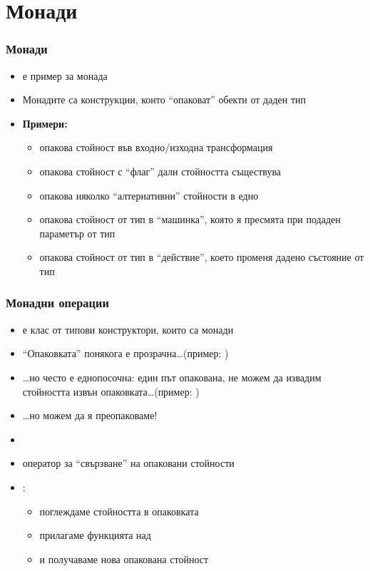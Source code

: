 \documentclass[alsotrans]{beamerswitch}
\begin{document}
\section{Монади}

\begin{frame}
  \frametitle{Монади}

  \begin{itemize}[<+->]
  \item {} е пример за \alert{монада}
  \item Монадите са конструкции, които ``опаковат'' обекти от даден тип
  \item \textbf{Примери:}
    \begin{itemize}
    \item {} опакова стойност във входно/изходна трансформация
    \item {} опакова стойност с ``флаг'' дали стойността съществува
    \item \lst{[a]} опакова няколко ``алтернативни'' стойности в едно
    \item {} опакова стойност от тип  в ``машинка'', която я пресмята при подаден параметър от тип 
    \item {} опакова стойност от тип  в ``действие'', което променя дадено състояние от тип 
    \end{itemize}
  \end{itemize}
\end{frame}

\begin{frame}
  \frametitle{Монадни операции}

  \begin{itemize}[<+->]
  \item {} е клас от \alert{типови конструктори}, които
    са монади
  \item ``Опаковката'' понякога е прозрачна\ldots (пример: )
  \item \ldots но често е \alert{еднопосочна}: един път опакована, не можем да извадим стойността извън опаковката\ldots (пример: )
  \item \ldots но можем да я преопаковаме!
  \item {}
  \item оператор за ``свързване'' на опаковани стойности
  \item {}:
    \begin{itemize}
    \item поглеждаме стойността  в опаковката 
    \item прилагаме функцията  над 
    \item и получаваме нова опакована стойност 
    \end{itemize}
  \end{itemize}
\end{frame}
\end{document}
